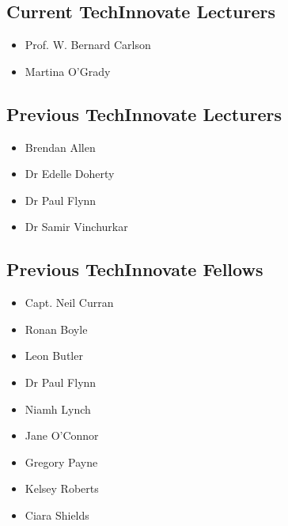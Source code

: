 \documentclass[10pt,a4paper]{res} %
\begin{document}
\begin{resume}
\subsection*{Current TechInnovate Lecturers}

\begin{itemize} \itemsep -2pt
\item Prof. W. Bernard Carlson
\item Martina O'Grady
\end{itemize}

\subsection*{Previous TechInnovate Lecturers}

\begin{itemize} \itemsep -2pt
\item Brendan Allen
\item Dr Edelle Doherty
\item Dr Paul Flynn
\item Dr Samir Vinchurkar
\end{itemize}

\subsection*{Previous TechInnovate Fellows}

\begin{itemize} \itemsep -2pt
\item Capt. Neil Curran
\item Ronan Boyle
\item Leon Butler
\item Dr Paul Flynn
\item Niamh Lynch
\item Jane O'Connor
\item Gregory Payne
\item Kelsey Roberts
\item Ciara Shields
\end{itemize}


\vspace{0.2in} %



\end{resume}
\end{document}

